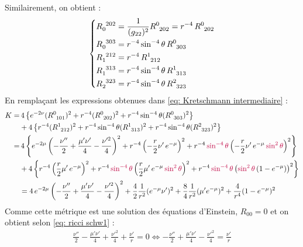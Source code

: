 Similairement, on obtient :
\begin{align}
    \begin{dcases}
        R\indices{_0^{202}} = \frac{1}{(g_{22})^2} R\indices{^0_{202}} = r^{-4} \,R\indices{^0_{202}}\\
        R\indices{_0^{303}} = r^{-4} \sin^{-4} \theta \, R\indices{^0_{303}} \\
        R\indices{_1^{212}} = r^{-4} \, R\indices{^1_{212}}\\
        R\indices{_1^{313}} = r^{-4} \sin^{-4} \theta \, R\indices{^1_{313}} \\
        R\indices{_2^{323}} = r^{-4} \sin^{-4} \theta \, R\indices{^2_{323}}
    \end{dcases}
\end{align}
En remplaçant les expressions obtenues dans \ref{eq: Kretschmann intermediaire} :
\begin{align*}
    K=& \, 4 \ltc e^{-2\nu} (R\indices{^0_{101}})^2 + r^{-4} (R\indices{^0_{202}})^2 + r^{-4} \sin^{-4} \theta (R\indices{^0_{303}})^2 \rtc \\
    &+ 4 \ltc r^{-4} (R\indices{^1_{212}})^2 + r^{-4} \sin^{-4} \theta (R\indices{^1_{313}})^2 + r^{-4} \sin^{-4} \theta (R\indices{^2_{323}})^2 \rtc\\
    =& \, 4 \ltc e^{-2\mu} \left(-\frac{\nu''}{2} + \frac{\mu' \nu'}{4} - \frac{\nu'^2}{4} \right)^2 + r^{-4} \left( - \frac{r}{2} \nu' \, e^{-\mu}\right)^2 + r^{-4}\, \purple{\sin^{-4} \theta} \lt - \frac{r}{2} \nu' \,e^{-\mu} \, \purple{\sin^2\theta}  \rt^2 \rtc \\
    & + 4 \ltc r^{-4} \left( \frac{r}{2}\mu'\, e^{-\mu} \right)^2 + r^{-4} \,\purple{\sin^{-4}\theta} \left( \frac{r}{2} \mu' \, e^{-\mu} \, \purple{\sin^2 \theta} \right)^2 + r^{-4} \,\purple{\sin^{-4} \theta} \left( \purple{\sin^2\theta}\, (1- e^{-\mu}) \right)^2 \rtc \\
    &= 4 \, e^{-2\mu} \left( -\frac{\nu''}{2} + \frac{\mu'\nu'}{4} - \frac{\nu'^2}{4} \right)^2 + \frac{4}{2} \frac{1}{r^2} (e^{-\mu} \nu')^2 + \frac{8}{4} \frac{1}{r^2} (\mu' e^{-\mu})^2 + \frac{4}{r^4} (1 - e^{-\mu})^2
\end{align*}
Comme cette métrique est une solution des équations d'Einstein, $R_{00} = 0$ et on obtient selon \ref{eq: ricci schw1} :
\begin{align*}
    \frac{\nu ''}{2} - \frac{\mu ' \nu '}{4} + \frac{\nu'^2}{4} + \frac{\nu '}{r} = 0 \iff -\frac{\nu ''}{2} + \frac{\mu ' \nu '}{4} - \frac{\nu'^2}{4} = \frac{\nu '}{r}
\end{align*}
